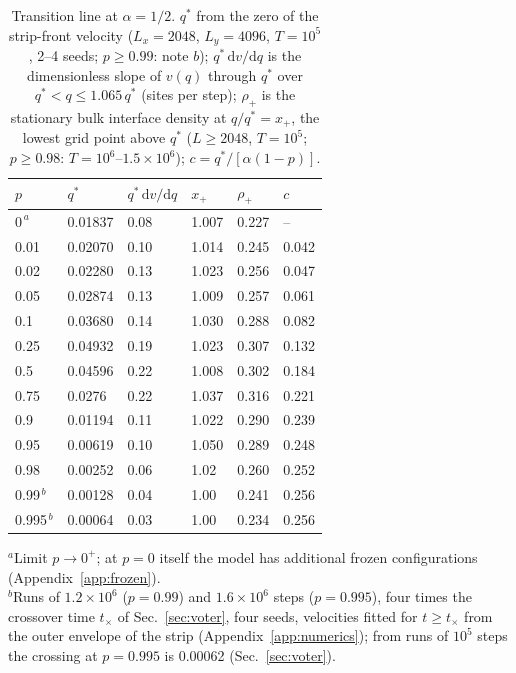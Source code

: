 \documentclass[pre,twocolumn,superscriptaddress,showpacs,floatfix]{revtex4-2}
\newcommand{\qs}{q^{*}}
\newcommand{\ds}{\mathrm{d}}
\begin{document}
\begin{table}
\caption{Transition line at $\alpha = 1/2$. $\qs$ from the zero of the strip-front velocity
($L_x = 2048$, $L_y = 4096$, $T = 10^5$, 2--4 seeds; $p\ge 0.99$: note $b$); $\qs\,\ds v/\ds q$ is
the dimensionless slope of $v(q)$ through $\qs$ over $\qs<q\le 1.065\,\qs$ (sites per step);
$\rho_+$ is the stationary bulk interface density at $q/\qs = x_+$, the lowest grid point above
$\qs$ ($L\ge 2048$, $T = 10^5$; $p\ge 0.98$: $T = 10^6$--$1.5\times10^6$); $c = \qs/[\alpha(1-p)]$.}
\label{tab:line}
\begin{ruledtabular}
\begin{tabular}{llllll}
$p$ & $\qs$ & $\qs\,\ds v/\ds q$ & $x_+$ & $\rho_+$ & $c$ \\
\hline
$0^{\,a}$ & 0.01837 & 0.08 & 1.007 & 0.227 & -- \\
0.01 & 0.02070 & 0.10 & 1.014 & 0.245 & 0.042 \\
0.02 & 0.02280 & 0.13 & 1.023 & 0.256 & 0.047 \\
0.05 & 0.02874 & 0.13 & 1.009 & 0.257 & 0.061 \\
0.1 & 0.03680 & 0.14 & 1.030 & 0.288 & 0.082 \\
0.25 & 0.04932 & 0.19 & 1.023 & 0.307 & 0.132 \\
0.5 & 0.04596 & 0.22 & 1.008 & 0.302 & 0.184 \\
0.75 & 0.0276 & 0.22 & 1.037 & 0.316 & 0.221 \\
0.9 & 0.01194 & 0.11 & 1.022 & 0.290 & 0.239 \\
0.95 & 0.00619 & 0.10 & 1.050 & 0.289 & 0.248 \\
0.98 & 0.00252 & 0.06 & 1.02 & 0.260 & 0.252 \\
0.99$^{\,b}$ & 0.00128 & 0.04 & 1.00 & 0.241 & 0.256 \\
0.995$^{\,b}$ & 0.00064 & 0.03 & 1.00 & 0.234 & 0.256 \\
\end{tabular}
\end{ruledtabular}
\begin{flushleft}\footnotesize
$^{a}$Limit $p\to 0^+$; at $p = 0$ itself the model has additional frozen configurations
(Appendix~\ref{app:frozen}).\\
$^{b}$Runs of $1.2\times10^6$ ($p = 0.99$) and $1.6\times10^6$ steps ($p = 0.995$), four times the
crossover time $t_\times$ of Sec.~\ref{sec:voter}, four seeds, velocities fitted for $t\ge t_\times$
from the outer envelope of the strip (Appendix~\ref{app:numerics}); from runs of $10^5$ steps the
crossing at $p = 0.995$ is 0.00062 (Sec.~\ref{sec:voter}).
\end{flushleft}
\end{table}
\end{document}
